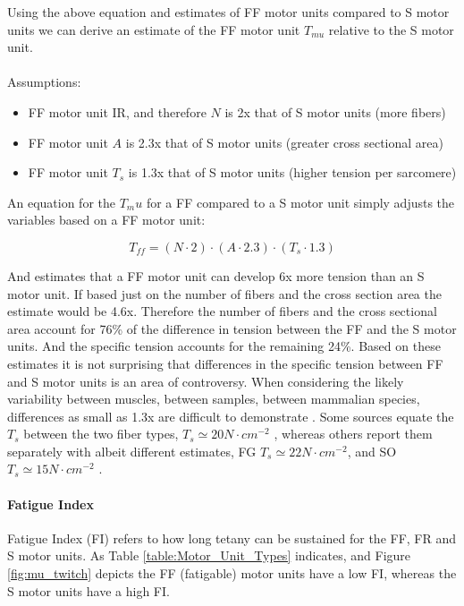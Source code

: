 Using the above equation and estimates of FF motor units compared to S motor units we can derive an estimate of the FF motor unit $T_{mu}$ relative to the S motor unit. 

\paragraph{}
Assumptions:
\begin{itemize}
    \item FF motor unit IR, and therefore $N$ is 2x that of S motor units (more fibers)
    \item FF motor unit $A$ is 2.3x that of S motor units (greater cross sectional area)
    \item FF motor unit $T_s$ is 1.3x that of S motor units (higher tension per sarcomere)
\end{itemize}

An equation for the $T_mu$ for a FF compared to a S motor unit simply adjusts the variables based on a FF motor unit:

\begin{equation}
    T_{ff} = (N \cdot 2) \cdot (A \cdot 2.3) \cdot (T_s \cdot 1.3)
\end{equation}

And estimates that a FF motor unit can develop 6x more tension than an S motor unit. If based just on the number of fibers and the cross section area the estimate would be 4.6x. Therefore the number of fibers and the cross sectional area account for 76\% of the difference in tension between the FF and the S motor units. And the specific tension accounts for the remaining 24\%. Based on these estimates it is not surprising that differences in the specific tension between FF and S motor units is an area of controversy. When considering the likely variability between muscles, between samples, between mammalian species, differences as small as 1.3x are difficult to demonstrate \cite{lieber_skeletal_2010}. Some sources equate the $T_s$ between the two fiber types, $T_s \simeq 20 N \cdot cm^{-2}$ \cite{feher_quantitative_2017}, whereas others report them separately with albeit different estimates, FG $T_s \simeq 22 N \cdot cm^{-2}$, and SO $T_s \simeq 15 N \cdot cm^{-2}$ \cite{lieber_skeletal_2010}.

\paragraph{Fatigue Index}
Fatigue Index (FI) refers to how long tetany can be sustained for the FF, FR and S motor units. As Table \ref{table:Motor_Unit_Types} indicates, and Figure \ref{fig:mu_twitch} depicts the FF (fatigable) motor units have a low FI, whereas the S motor units have a high FI.


